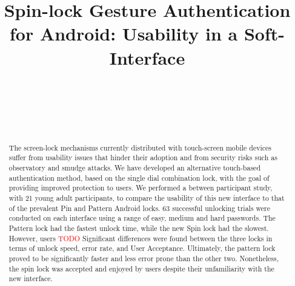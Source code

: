 \documentclass{sigchi}
\newcommand{\comment}[1]{\textcolor{red}{#1}}
\begin{document}
\title{Spin-lock Gesture Authentication for Android: Usability in a Soft-Interface}

\author{%
  \\
  \\
  \\
  \\
}

\maketitle

\begin{abstract}
The screen-lock mechanisms currently distributed with touch-screen mobile devices suffer from usability issues that hinder their adoption and from security risks such as observatory and smudge attacks. We have developed an alternative touch-based authentication method, based on the single dial combination lock, with the goal of providing improved protection to users. We performed a between participant study, with 21 young adult participants, to compare the usability of this new interface to that of the prevalent Pin and Pattern Android locks. 63 successful unlocking trials were conducted on each interface using a range of easy, medium and hard passwords. The Pattern lock had the fastest unlock time, while the new Spin lock had the slowest. However, users 
\comment{TODO}
 Significant differences were found between the three locks in terms of unlock speed, error rate, and User Acceptance. Ultimately, the pattern lock proved to be significantly faster and less error prone than the other two. Nonetheless, the spin lock was accepted and enjoyed by users despite their unfamiliarity with the new interface.

\end{abstract}
\end{document}
